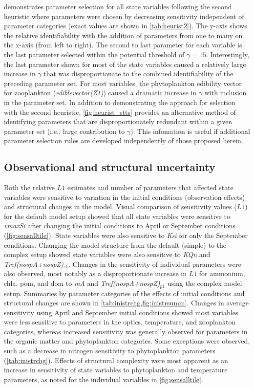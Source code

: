 \documentclass[letterpaper,12pt,oneside]{article}\usepackage[]{graphicx}\usepackage[]{color}
\begin{document}
 demonstrates parameter selection for all state variables following the second heuristic where parameters were chosen by decreasing sensitivity independent of parameter categories (exact values are shown in \cref{tab:heurist2}).  The y-axis shows the relative identifiability with the addition of parameters from one to many on the x-axis (from left to right).  The second to last parameter for each variable is the last parameter selected within the potential threshold of $\gamma = 15$.  Interestingly, the last parameter shown for most of the state variables caused a relatively large increase in $\gamma$ that was disproportionate to the combined identifiability of the preceding parameter set. For most variables, the phytoplankton edibility vector for zooplankton (\textit{ediblevector(Z1)}) caused a dramatic increase in $\gamma$ with inclusion in the parameter set.  In addition to demonstrating the approach for selection with the second heuristic, \cref{fig:heurist_stts} provides an alternative method of identifying parameters that are disproportionately redundant within a given parameter set (i.e., large contribution to $\gamma$).  This infomation is useful if additional parameter selection rules are developed independently of those proposed herein. 

\subsection{Observational and structural uncertainty}

Both the relative $L1$ estimates and number of parameters that affected state variables were sensitive to variation in the initial conditions (observation effects) and structural changes in the model.  Visual comparison of sensitivity values ($L1$) for the default model setup showed that all state variables were sensitive to \textit{vmaxSi} after changing the initial conditions to April or September conditions (\cref{fig:sensalltile}).  State variables were also sensitive to \textit{Ksi} for only the September conditions. Changing the model structure from the default (simple) to the complex setup showed state variables were also sensitive to \textit{KQn} and \textit{Tref(nospA+nospZ)$_{z1}$}.  Changes in the sensitivity of individual parameters were also observed, most notably as a disproportionate increase in $L1$ for ammonium, \ac{chla}, \ac{pom}, and \ac{dom} to \textit{mA} and \textit{Tref(nospA+nospZ)$_{p1}$} using the complex model setup.  Summaries by parameter categories of the effects of initial conditions and structural changes are shown in \cref{tab:inistrchg,fig:inistrsumm}. Changes in average sensitivity using April and September initial conditions showed most variables were less sensitive to parameters in the optics, temperature, and zooplankton categories, whereas increased sensitivity was generally observed for parameters in the organic matter and phytoplankton categories.  Some exceptions were observed, such as a decrease in nitrogen sensitivity to phytoplankton parameters (\cref{tab:inistrchg}).  Effects of structural complexity were most apparent as an increase in sensitivity of state variables to phytoplankton and temperature parameters, as noted for the individual variables in \cref{fig:sensalltile}. 
\end{document}

